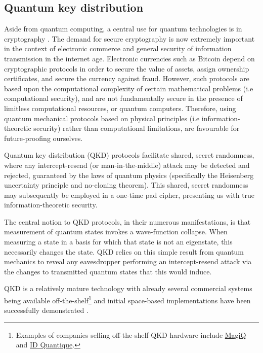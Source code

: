 %
%

\subsection{Quantum key distribution} \label{sec:QKD} 

Aside from quantum computing, a central use for quantum technologies is in cryptography \cite{bib:Gisin02}. The demand for secure cryptography is now extremely important in the context of electronic commerce and general security of information transmission in the internet age. Electronic currencies such as Bitcoin depend on cryptographic protocols in order to secure the value of assets, assign ownership certificates, and secure the currency against fraud. However, such protocols are based upon the computational complexity of certain mathematical problems (i.e computational security), and are not fundamentally secure in the presence of limitless computational resources, or quantum computers. Therefore, using quantum mechanical protocols based on physical principles (i.e information-theoretic security) rather than computational limitations, are favourable for future-proofing ourselves.

Quantum key distribution (QKD) protocols facilitate shared, secret randomness, where any intercept-resend (or man-in-the-middle) attack may be detected and rejected, guaranteed by the laws of quantum physics (specifically the Heisenberg uncertainty principle and no-cloning theorem). This shared, secret randomness may subsequently be employed in a one-time pad cipher, presenting us with true information-theoretic security.

The central notion to QKD protocols, in their numerous manifestations, is that measurement of quantum states invokes a wave-function collapse. When measuring a state in a basis for which that state is not an eigenstate, this necessarily changes the state. QKD relies on this simple result from quantum mechanics to reveal any eavesdropper performing an intercept-resend attack via the changes to transmitted quantum states that this would induce.

QKD is a relatively mature technology with already several commercial systems being available off-the-shelf\footnote{Examples of companies selling off-the-shelf QKD hardware include \href{http://www.magiqtech.com}{MagiQ} and \href{http://www.idquantique.com}{ID Quantique}.} and initial space-based implementations have been successfully demonstrated \cite{Pan}.

